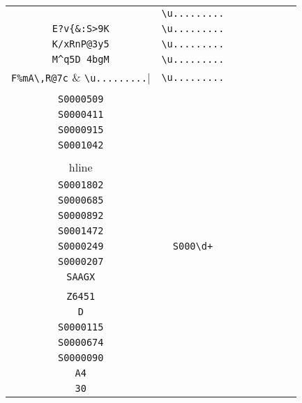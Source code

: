 \begin{longtable}{cccccccc}
\begin{tabular}{ll}
    \verb|LJLZhc3il?| & \verb|\u.........|\\
\verb|E?v{&:S>9K| & \verb|\u.........|\\
\verb|K/xRnP@3y5| & \verb|\u.........|\\
\verb|M^q5D 4bgM| & \verb|\u.........|\\
\verb|F%mA\,R@7c| & \verb|\u.........|
\end{tabular}
\\\midrule 
\begin{tabular}{l}
    \verb|S0000214|\\
\verb|S0000509|\\
\verb|S0000411|\\
\verb|S0000915|\\
\verb|S0001042|\\
\\hline\\
\verb|S0001802|\\
\verb|S0000685|\\
\verb|S0000892|\\
\verb|S0001472|\\
\verb|S0000249|
\end{tabular}

&
\verb|S000\d+|
&

\begin{tabular}{l}
    \verb.((\u)*(\d)*)|(S0000\d\d\d).\\
\verb|S0000207|\\
\verb|SAAGX|\\
\verb||\\
\verb|Z6451|\\
\verb|D|
\end{tabular}

&

\begin{tabular}{l}
    \verb.((\u)*(\d)*)|(S0000\d\d)\d.\\
\verb|S0000115|\\
\verb|S0000674|\\
\verb|S0000090|\\
\verb|A4|\\
\verb|30|
\end{tabular}

&


\end{longtable}
